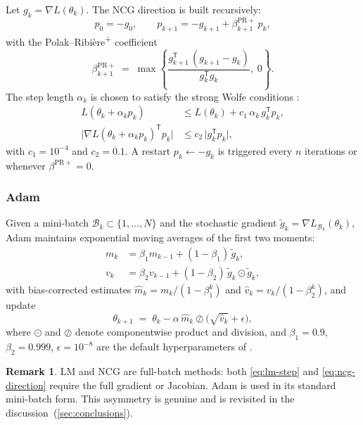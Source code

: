 \documentclass[11pt,letterpaper]{article}
\newcommand{\T}{^{\mathsf{T}}}
\newcommand{\grad}{\nabla}
\theoremstyle{definition}
\newtheorem{remark}{Remark}[section]
\begin{document}
Let $g_k = \grad L(\theta_k)$. The NCG direction is built recursively:
\begin{equation}
p_0 = -g_0, \qquad
p_{k+1} = -g_{k+1} + \beta_{k+1}^{\mathrm{PR+}}\, p_k,
\label{eq:ncg-direction}
\end{equation}
with the Polak--Ribière\textsuperscript{+} coefficient
\begin{equation}
\beta_{k+1}^{\mathrm{PR+}}
\;=\;
\max\!\left\{
\frac{g_{k+1}\T\,(g_{k+1} - g_k)}{g_k\T g_k},\;
0
\right\}.
\label{eq:pr-plus}
\end{equation}
The step length $\alpha_k$ is chosen to satisfy the strong Wolfe
conditions \citep[Algorithms~3.5--3.6]{NocedalWright2006}:
\begin{align}
L(\theta_k + \alpha_k p_k) &\leq L(\theta_k) + c_1\, \alpha_k\, g_k\T p_k,
\label{eq:wolfe-1}\\[2pt]
\bigl|\grad L(\theta_k + \alpha_k p_k)\T p_k\bigr|
  &\leq c_2\, \bigl|g_k\T p_k\bigr|,
\label{eq:wolfe-2}
\end{align}
with $c_1 = 10^{-4}$ and $c_2 = 0.1$. A restart
$p_k \leftarrow -g_k$ is triggered every $n$ iterations or whenever
$\beta^{\mathrm{PR+}} = 0$.
 
\subsubsection{Adam}
\label{sec:adam}
 
Given a mini-batch $\mathcal{B}_k \subset \{1,\ldots, N\}$ and the
stochastic gradient
$\tilde g_k = \grad L_{\mathcal{B}_k}(\theta_k)$, Adam maintains
exponential moving averages of the first two moments:
\begin{align}
m_k &= \beta_1 m_{k-1} + (1 - \beta_1)\, \tilde g_k, \\
v_k &= \beta_2 v_{k-1} + (1 - \beta_2)\, \tilde g_k \odot \tilde g_k,
\end{align}
with bias-corrected estimates
$\hat m_k = m_k/(1-\beta_1^{k})$ and
$\hat v_k = v_k/(1-\beta_2^{k})$, and update
\begin{equation}
\theta_{k+1}
\;=\;
\theta_k - \alpha\, \hat m_k \oslash \bigl(\sqrt{\hat v_k} + \epsilon\bigr),
\label{eq:adam-update}
\end{equation}
where $\odot$ and $\oslash$ denote componentwise product and division, and
$\beta_1 = 0.9$, $\beta_2 = 0.999$, $\epsilon = 10^{-8}$ are the default
hyperparameters of \citet{KingmaBa2015}.
 
\begin{remark}
\label{rem:batch-asymmetry}
LM and NCG are full-batch methods: both \cref{eq:lm-step} and
\cref{eq:ncg-direction} require the full gradient or Jacobian. Adam is used
in its standard mini-batch form. This asymmetry is genuine and is
revisited in the discussion~(\cref{sec:conclusions}).
\end{remark}
 
\end{document}
